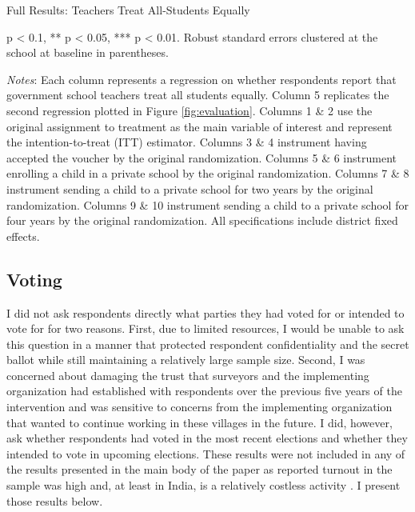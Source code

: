 \documentclass[hidelinks, 12pt, titlepage]{article}
\begin{document}
\begin{landscape}
				\begin{table}
					\begin{threeparttable}
						\centering
						\caption{Full Results: Teachers Treat All-Students Equally\label{table:appendixteacherstreat}}
						
						\begin{tablenotes}
							\item * p < 0.1, ** p < 0.05, *** p < 0.01. Robust standard errors clustered at the school at baseline in parentheses.
							\item \emph{Notes}: Each column represents a regression on whether respondents report that government school teachers treat all students equally.  Column 5 replicates the second regression plotted in Figure \ref{fig:evaluation}.  Columns 1 \& 2 use the original assignment to treatment as the main variable of interest and represent the intention-to-treat (ITT) estimator.  Columns 3 \& 4 instrument having accepted the voucher by the original randomization.  Columns 5 \& 6 instrument enrolling a child in a private school by the original randomization.  Columns 7 \& 8 instrument sending a child to a private school for two years by the original randomization.  Columns 9 \& 10 instrument sending a child to a private school for four years by the original randomization.  All specifications include district fixed effects.
						\end{tablenotes}
					\end{threeparttable}
				\end{table}

			\end{landscape}

		\subsection*{Voting}

			I did not ask respondents directly what parties they had voted for or intended to vote for for two reasons.  First, due to limited resources, I would be unable to ask this question in a manner that protected respondent confidentiality and the secret ballot while still maintaining a relatively large sample size.  Second, I was concerned about damaging the trust that surveyors and the implementing organization had established with respondents over the previous five years of the intervention and was sensitive to concerns from the implementing organization that wanted to continue working in these villages in the future.  I did, however, ask whether respondents had voted in the most recent elections and whether they intended to vote in upcoming elections.  These results were not included in any of the results presented in the main body of the paper as reported turnout in the sample was high and, at least in India, is a relatively costless activity \citep{Banerjee2011a,Kasara2015a}.  I present those results below.
\end{document}
